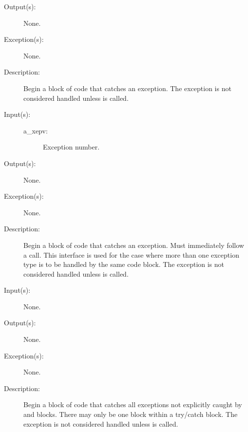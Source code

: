 \begin{description}
\begin{description}
	\item[Output(s): ] None.
	\item[Exception(s): ] None.
	\item[Description: ]
		Begin a block of code that catches an exception.  The exception
		is not considered handled unless  is
		called.
	\end{description}
\label{xep_mcatch}
\item[{\cppmacro{xep\_mcatch}{cw\_xepv\_t a\_xepv} \dots}: ]
	\begin{description}\item[]
	\item[Input(s): ]
		\begin{description}\item[]
		\item[a\_xepv: ]
			Exception number.
		\end{description}
	\item[Output(s): ] None.
	\item[Exception(s): ] None.
	\item[Description: ]
		Begin a block of code that catches an exception.  Must
		immediately follow a  call.  This interface
		is used for the case where more than one exception type is to be
		handled by the same code block.  The exception is not considered
		handled unless  is called.
	\end{description}
\label{xep_acatch}
\item[{\cppdef{xep\_acatch} \dots}: ]
	\begin{description}\item[]
	\item[Input(s): ] None.
	\item[Output(s): ] None.
	\item[Exception(s): ] None.
	\item[Description: ]
		Begin a block of code that catches all exceptions not explicitly
		caught by  and 
		blocks.  There may only be one  block within
		a try/catch block.  The exception is not considered handled
		unless  is called.
	\end{description}
\label{xep_finally}
\item[{\cppdef{xep\_finally} \dots}: ]
	\begin{description}\item[]

\end{description}
\end{description}
